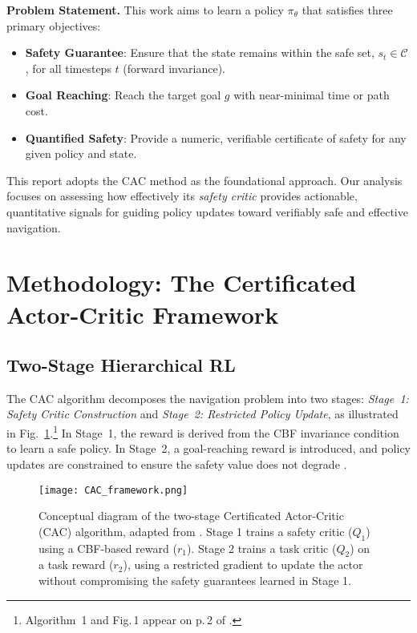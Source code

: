 \documentclass[10pt,conference]{IEEEtran}
\begin{document}
\textbf{Problem Statement.}
This work aims to learn a policy $\pi_\theta$ that satisfies three primary objectives:
\begin{itemize}
    \item \textbf{Safety Guarantee}: Ensure that the state remains within the safe set, $s_t\in \mathcal{C}$, for all timesteps $t$ (forward invariance).
    \item \textbf{Goal Reaching}: Reach the target goal $g$ with near-minimal time or path cost.
    \item \textbf{Quantified Safety}: Provide a numeric, verifiable certificate of safety for any given policy and state.
\end{itemize}
This report adopts the CAC method as the foundational approach. Our analysis focuses on assessing how effectively its \emph{safety critic} provides actionable, quantitative signals for guiding policy updates toward verifiably safe and effective navigation.

\section{Methodology: The Certificated Actor-Critic Framework}
\subsection{Two-Stage Hierarchical RL}
The CAC algorithm decomposes the navigation problem into two stages: \emph{Stage~1: Safety Critic Construction} and \emph{Stage~2: Restricted Policy Update}, as illustrated in Fig.~\ref{fig:framework}.\footnote{Algorithm~1 and Fig.\,1 appear on p.\,2 of \cite{Xie2025CAC}.} In Stage~1, the reward is derived from the CBF invariance condition to learn a safe policy. In Stage~2, a goal-reaching reward is introduced, and policy updates are constrained to ensure the safety value does not degrade \cite{Xie2025CAC}.

\begin{figure}[t]
    \centering
    \texttt{[image: CAC\_framework.png]} 
    \caption{Conceptual diagram of the two-stage Certificated Actor-Critic (CAC) algorithm, adapted from \cite{Xie2025CAC}. Stage 1 trains a safety critic ($Q_1$) using a CBF-based reward ($r_1$). Stage 2 trains a task critic ($Q_2$) on a task reward ($r_2$), using a restricted gradient to update the actor without compromising the safety guarantees learned in Stage 1.}
    \label{fig:framework}
\end{figure}
\end{document}

